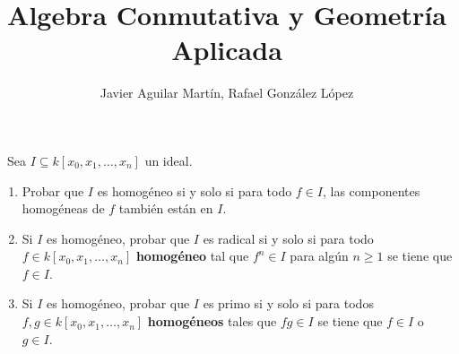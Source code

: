 \documentclass[twoside]{article}
\begin{document}
\title{Algebra Conmutativa y Geometría Aplicada}
\author{Javier Aguilar Martín, Rafael González López}
\maketitle
\begin{ejercicio}{1}\
Sea $I \subseteq k[x_0, x_1,\dots, x_n]$ un ideal.
\begin{enumerate}
\item Probar que $I$ es homogéneo si y solo si para todo $f \in I$, las
componentes
homogéneas de $f$ también están en $I$.
\item  Si $I$ es homogéneo, probar que $I$ es radical si y solo si para todo $f \in k[x_0, x_1,\dots, x_n]$
\textbf{homogéneo} tal que $f^n \in I$ para algún $n \geq 1$ se tiene que $f \in I$.
\item Si $I$ es homogéneo, probar que $I$ es primo si y solo si para todos $f, g \in
k[x_0, x_1,\dots, x_n]$ \textbf{homogéneos} tales que $fg \in I$ se tiene que $f \in I$ o $g \in I$.
\end{enumerate}
\end{ejercicio}
\end{document}
